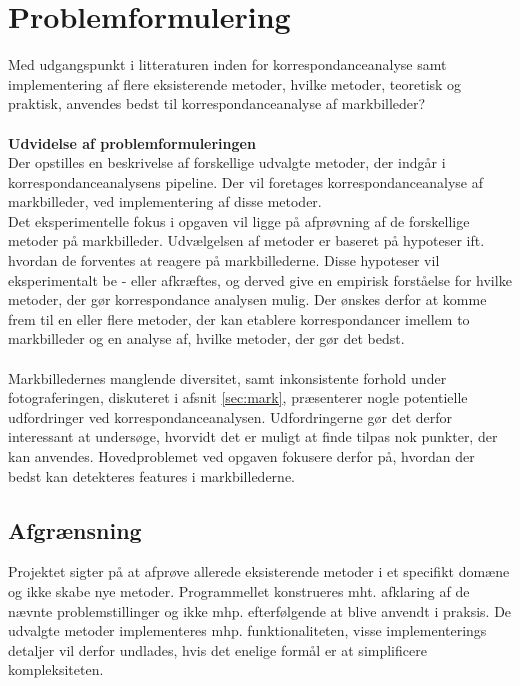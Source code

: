 \section{Problemformulering} \label{subsec:form}
Med udgangspunkt i litteraturen inden for
korrespondanceanalyse samt implementering af
flere eksisterende metoder, hvilke metoder, teoretisk og praktisk, anvendes bedst til korrespondanceanalyse af markbilleder? \\ \\
\textbf{Udvidelse af problemformuleringen} \\
Der opstilles en beskrivelse af forskellige udvalgte metoder, der indgår i korrespondanceanalysens pipeline. Der vil foretages korrespondanceanalyse af markbilleder, ved implementering af disse metoder. \\
Det eksperimentelle fokus i opgaven vil ligge på afprøvning af de forskellige metoder på markbilleder. Udvælgelsen af metoder er baseret på hypoteser ift. hvordan de forventes at reagere på markbillederne. Disse hypoteser vil eksperimentalt be - eller afkræftes, og derved give en empirisk forståelse for hvilke metoder, der gør korrespondance analysen mulig. Der ønskes derfor at komme frem til en eller flere metoder, der kan etablere korrespondancer imellem to markbilleder og en analyse af, hvilke metoder, der gør det bedst.
\\ \\
Markbilledernes manglende diversitet, samt inkonsistente forhold under fotograferingen, diskuteret i afsnit \ref{sec:mark}, præsenterer nogle potentielle udfordringer ved korrespondanceanalysen. Udfordringerne gør det derfor interessant at undersøge, hvorvidt det er muligt at finde tilpas nok punkter, der kan anvendes. Hovedproblemet ved opgaven fokusere derfor på, hvordan der bedst kan detekteres features i markbillederne.
\subsection{Afgrænsning} \label{subsec:afg}
Projektet sigter på at afprøve allerede eksisterende metoder i et specifikt domæne og ikke
skabe nye metoder. Programmellet konstrueres mht. afklaring af de nævnte problemstillinger
og ikke mhp. efterfølgende at blive anvendt i praksis. De udvalgte metoder implementeres mhp. funktionaliteten, visse implementerings detaljer vil derfor undlades, hvis det enelige formål er at simplificere kompleksiteten.
